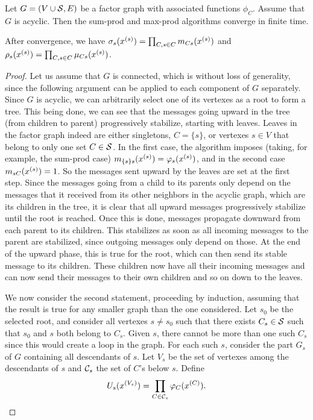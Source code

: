 \begin{proposition}
\label{prop:fct.grph.cvg}
Let $G = (V\cup{\mathcal S}, E)$ be a factor graph with associated
functions $\phi_C$. Assume that $G$ is acyclic. Then the sum-prod and max-prod algorithms converge
in finite time. 

After convergence, we have 
$\sigma_s(x^{(s)}) = \prod_{C, s\in C} m_{Cs}(x^{(s)})$
and 
$\rho_s(x^{(s)}) = \prod_{C, s\in C} \mu_{Cs}(x^{(s)})$.
\end{proposition}
\begin{proof}
Let us assume that $G$ is connected, which is without loss of
generality, since the following argument can be applied to each component of $G$ separately.
Since $G$ is acyclic, we can
arbitrarily select one of its vertexes as a root to form a tree.
This
being done, we can see that the messages going upward in the tree
(from children to parent) progressively stabilize, starting with leaves.
Leaves in the factor graph indeed are either singletons, $C=\{s\}$, or vertexes
$s\in V$ that belong to only one set $C\in{\mathcal S}$. In the first case, the
algorithm imposes (taking, for example, the sum-prod case)
$m_{\{s\}s}(x^{(s)}) = \varphi_s(x^{(s)})$, and in the second case 
$m_{sC}(x^{(s)}) = 1$. So the messages sent upward by the leaves are set at the
first step. Since the messages going from a child to its parents only
depend on the messages that it received from its other neighbors
in the acyclic graph, which are its children in the tree,  it is clear
that all upward messages progressively stabilize until the root is
reached. Once this is done, messages propagate downward 
from each parent to its children. This stabilizes as soon as all
incoming messages to the parent are stabilized, since outgoing messages
only depend on those. At the end of the upward phase, this is true
for the root, which can then send its stable message to its
children. These children now have all their incoming messages and can
now send their messages to their own children and so on down to the
leaves.

We now consider the second statement,   proceeding by induction,  assuming that the result is true for any
smaller graph than the one considered. Let $s_0$ be the selected root, and
consider all vertexes $s\neq s_0$ such that  there exists $C_s\in
{\mathcal S}$ such
that $s_0$ and $s$ both belong to $C_s$. Given $s$, there cannot be more than
one such $C_s$ since this would create a loop in the graph. For each such $s$, consider the part
$G_s$ of $G$ containing all descendants of $s$. Let $V_s$ be the set
of vertexes among the descendants of $s$ and ${\mathcal C}_s$ the set of $C$'s
below $s$. Define
\[
U_s(x^{(V_s)}) = \prod_{C\in{\mathcal C}_s}\varphi_C(x^{(C)}).
\]


\end{proof}
